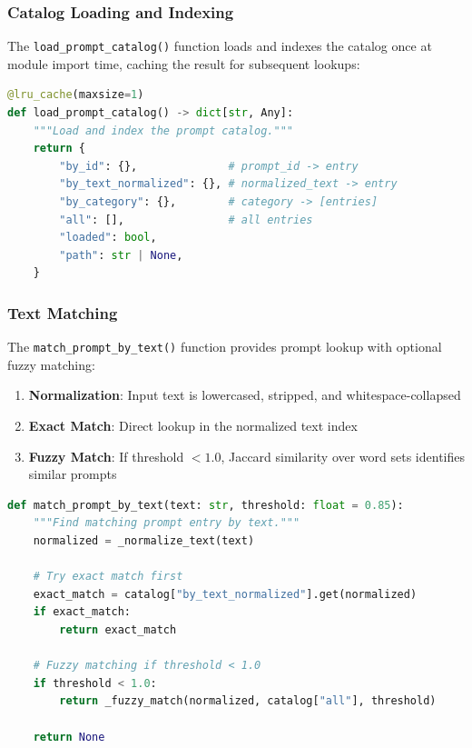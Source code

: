 \subsubsection{Catalog Loading and Indexing}

The \texttt{load\_prompt\_catalog()} function loads and indexes the catalog once at module import time, caching the result for subsequent lookups:

\begin{lstlisting}[language=Python, caption={Catalog indexing structure}, label=lst:catalog-index]
@lru_cache(maxsize=1)
def load_prompt_catalog() -> dict[str, Any]:
    """Load and index the prompt catalog."""
    return {
        "by_id": {},              # prompt_id -> entry
        "by_text_normalized": {}, # normalized_text -> entry
        "by_category": {},        # category -> [entries]
        "all": [],                # all entries
        "loaded": bool,
        "path": str | None,
    }
\end{lstlisting}

\subsubsection{Text Matching}

The \texttt{match\_prompt\_by\_text()} function provides prompt lookup with optional fuzzy matching:

\begin{enumerate}
    \item \textbf{Normalization}: Input text is lowercased, stripped, and whitespace-collapsed
    \item \textbf{Exact Match}: Direct lookup in the normalized text index
    \item \textbf{Fuzzy Match}: If threshold $< 1.0$, Jaccard similarity over word sets identifies similar prompts
\end{enumerate}

\begin{lstlisting}[language=Python, caption={Prompt matching algorithm}, label=lst:prompt-matching]
def match_prompt_by_text(text: str, threshold: float = 0.85):
    """Find matching prompt entry by text."""
    normalized = _normalize_text(text)
    
    # Try exact match first
    exact_match = catalog["by_text_normalized"].get(normalized)
    if exact_match:
        return exact_match
    
    # Fuzzy matching if threshold < 1.0
    if threshold < 1.0:
        return _fuzzy_match(normalized, catalog["all"], threshold)
    
    return None
\end{lstlisting}

